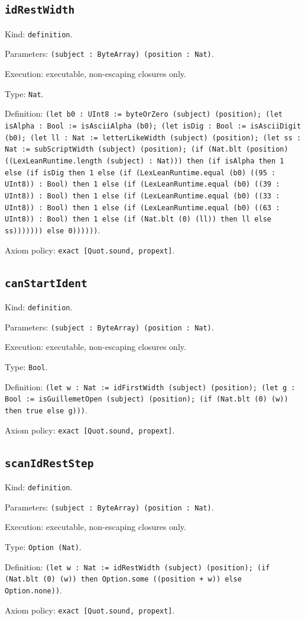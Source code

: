 \documentclass[11pt]{article}
\begin{document}
\subsection*{\texttt{idRestWidth}}
\noindent Kind: \texttt{definition}.\par
\noindent Parameters: \texttt{(subject : ByteArray) (position : Nat)}.\par
\noindent Execution: executable, non-escaping closures only.\par
\noindent Type: \texttt{Nat}.\par
\noindent Definition: \texttt{(let b0 : UInt8 := byteOrZero (subject) (position); (let isAlpha : Bool := isAsciiAlpha (b0); (let isDig : Bool := isAsciiDigit (b0); (let ll : Nat := letterLikeWidth (subject) (position); (let ss : Nat := subScriptWidth (subject) (position); (if (Nat.blt (position) ((LexLeanRuntime.length (subject) : Nat))) then (if isAlpha then 1 else (if isDig then 1 else (if (LexLeanRuntime.equal (b0) ((95 : UInt8)) : Bool) then 1 else (if (LexLeanRuntime.equal (b0) ((39 : UInt8)) : Bool) then 1 else (if (LexLeanRuntime.equal (b0) ((33 : UInt8)) : Bool) then 1 else (if (LexLeanRuntime.equal (b0) ((63 : UInt8)) : Bool) then 1 else (if (Nat.blt (0) (ll)) then ll else ss))))))) else 0))))))}.\par
\noindent Axiom policy: \texttt{exact [Quot.sound, propext]}.\par
\subsection*{\texttt{canStartIdent}}
\noindent Kind: \texttt{definition}.\par
\noindent Parameters: \texttt{(subject : ByteArray) (position : Nat)}.\par
\noindent Execution: executable, non-escaping closures only.\par
\noindent Type: \texttt{Bool}.\par
\noindent Definition: \texttt{(let w : Nat := idFirstWidth (subject) (position); (let g : Bool := isGuillemetOpen (subject) (position); (if (Nat.blt (0) (w)) then true else g)))}.\par
\noindent Axiom policy: \texttt{exact [Quot.sound, propext]}.\par
\subsection*{\texttt{scanIdRestStep}}
\noindent Kind: \texttt{definition}.\par
\noindent Parameters: \texttt{(subject : ByteArray) (position : Nat)}.\par
\noindent Execution: executable, non-escaping closures only.\par
\noindent Type: \texttt{Option (Nat)}.\par
\noindent Definition: \texttt{(let w : Nat := idRestWidth (subject) (position); (if (Nat.blt (0) (w)) then Option.some ((position + w)) else Option.none))}.\par
\noindent Axiom policy: \texttt{exact [Quot.sound, propext]}.\par
\end{document}
